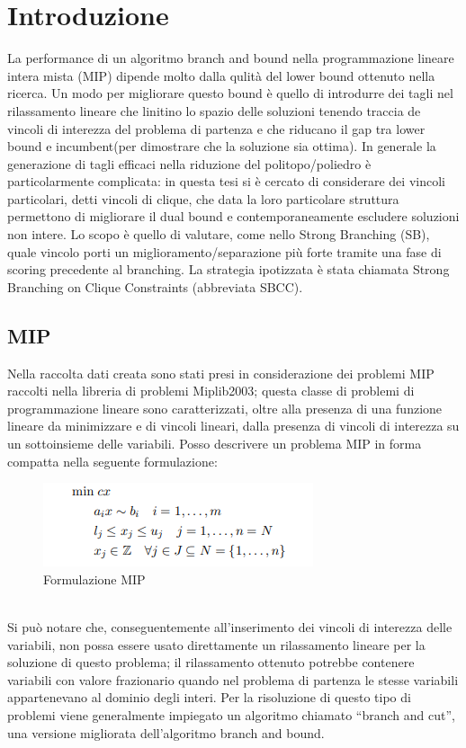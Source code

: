 \documentclass[12pt,a4paper,twoside,openright]{book}
\begin{document}
\mainmatter

\chapter{Introduzione}
La performance di un algoritmo branch and bound nella programmazione lineare intera mista (MIP)
dipende molto dalla qulità del lower bound ottenuto nella ricerca. Un modo per migliorare questo bound
è quello di introdurre dei tagli nel rilassamento lineare che linitino lo spazio delle soluzioni tenendo traccia
de vincoli di interezza del problema di partenza e che riducano il gap tra lower bound e incumbent(per dimostrare che la soluzione sia ottima).
In generale la generazione di tagli efficaci nella riduzione del politopo/poliedro è particolarmente 
complicata: in questa tesi si è cercato di considerare dei vincoli particolari, detti vincoli di clique,
che data la loro particolare struttura permettono di migliorare il dual bound e contemporaneamente escludere 
soluzioni non intere. Lo scopo è quello di valutare, come nello Strong Branching (SB), quale vincolo porti un 
miglioramento/separazione più forte tramite una fase di scoring precedente al branching. La strategia
ipotizzata è stata chiamata Strong Branching on Clique Constraints (abbreviata SBCC).

\section{MIP}
Nella raccolta dati creata sono stati presi in considerazione dei problemi
MIP raccolti nella libreria di problemi Miplib2003; questa classe di problemi
di programmazione lineare sono caratterizzati, oltre alla presenza di una funzione
lineare da minimizzare e di vincoli lineari, dalla presenza di vincoli di interezza
su un sottoinsieme delle variabili. Posso descrivere un problema MIP in forma compatta
nella seguente formulazione: 
\begin{figure}[ht]
    \centering
    \includegraphics [scale = 0.7]{mip_scheme.png}
    \caption{ Formulazione MIP }
    \label{fig:mip}
\end{figure}\\
Si può notare che, conseguentemente all’inserimento dei vincoli di interezza delle variabili,
non possa essere usato direttamente un rilassamento lineare per la soluzione di questo
problema; il rilassamento ottenuto potrebbe contenere variabili con valore frazionario
quando nel problema di partenza le stesse variabili appartenevano al dominio degli interi.
Per la risoluzione di questo tipo di problemi viene generalmente impiegato un algoritmo 
chiamato “branch and cut”, una versione migliorata dell’algoritmo branch and bound.
\end{document}
